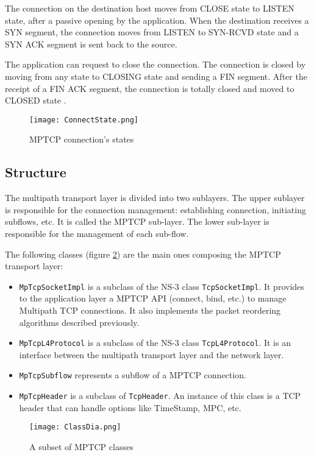 \documentclass{sig-alternate}
\begin{document}
The connection on the destination host moves from CLOSE state to LISTEN state, after a passive opening by the application. When the destination receives a SYN segment, the connection moves from LISTEN to SYN-RCVD state and a SYN ACK segment is sent back to the source. 

The application can request to close the connection. The connection is closed by moving from any state to CLOSING state and sending a FIN segment. After the receipt of a FIN ACK segment, the connection is totally closed and moved to CLOSED state .


\begin{figure}[h]
\centering
\texttt{[image: ConnectState.png]} 
\caption{MPTCP connection's states}
\label{ConState}
\end{figure} 



\subsection{Structure}

The multipath transport layer is divided into two sublayers. The upper sublayer is responsible for the connection management: establishing connection, initiating subflows, etc. It is called the MPTCP sub-layer. The lower sub-layer is responsible for the management of each sub-flow.

The following classes (figure \ref{ClassDia}) are the main ones composing the MPTCP transport layer: 
\begin{itemize}
\item \texttt{MpTcpSocketImpl} is a subclass of the NS-3 class \texttt{TcpSocketImpl}. It provides to the application layer a MPTCP API (connect, bind, etc.) to manage Multipath TCP connections. It also implements the packet reordering algorithms described previously.
\item \texttt{MpTcpL4Protocol} is a subclass of the NS-3 class \texttt{TcpL4Protocol}. It is an interface between the multipath transport layer and the network layer.
\item \texttt{MpTcpSubflow} represents a subflow of a MPTCP connection. 
\item \texttt{MpTcpHeader}  is a subclass of \texttt{TcpHeader}. An instance of this class is a TCP header that can handle options like TimeStamp, MPC, etc.
\end{itemize}


\begin{figure}[h]
\centering
\texttt{[image: ClassDia.png]} 
\caption{A subset of MPTCP classes}
\label{ClassDia}
\end{figure} 
\end{document}
